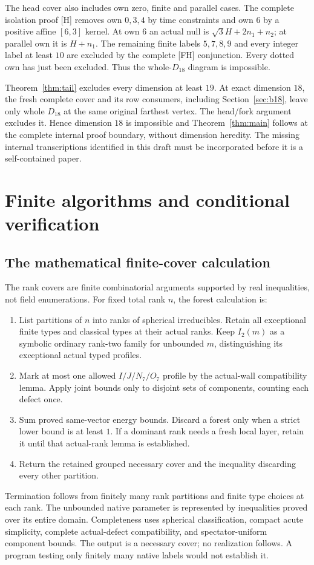 \documentclass[11pt]{article}
\theoremstyle{definition}
\theoremstyle{remark}
\newcommand{\src}[1]{\textnormal{\textsf{[#1]}}}
\begin{document}
The head cover also includes own zero, finite and parallel
cases. The complete isolation proof \src{H} removes own
\(0,3,4\) by time constraints and own \(6\) by a positive
affine \([6,3]\) kernel. At own \(6\) an actual null is
\(\sqrt3H+2n_1+n_2\); at parallel own it is \(H+n_1\).
The remaining finite labels \(5,7,8,9\) and every integer
label at least \(10\) are excluded by the complete \src{FH}
conjunction. Every dotted own has just been excluded.
Thus the whole-\(D_{18}\) diagram is impossible.

Theorem~\ref{thm:tail} excludes every dimension at least \(19\).
At exact dimension \(18\), the fresh complete cover and its
row consumers, including Section~\ref{sec:b18}, leave only
whole \(D_{18}\) at the same original farthest vertex.
The head/fork argument excludes it. Hence dimension \(18\)
is impossible and Theorem~\ref{thm:main} follows at the
complete internal proof boundary, without dimension heredity.
The missing internal transcriptions identified in this draft
must be incorporated before it is a self-contained paper.

\section{Finite algorithms and conditional verification}
\label{sec:verification}
\subsection{The mathematical finite-cover calculation}
The rank covers are finite combinatorial arguments supported
by real inequalities, not field enumerations.
For fixed total rank \(n\), the forest calculation is:
\begin{enumerate}
\item List partitions of \(n\) into ranks of spherical irreducibles.
 Retain all exceptional finite types and classical types at
 their actual ranks. Keep \(I_2(m)\) as a symbolic ordinary
 rank-two family for unbounded \(m\), distinguishing its
 exceptional actual typed profiles.
\item Mark at most one allowed \(I/J/N_7/O_7\) profile by the
 actual-wall compatibility lemma. Apply joint bounds only to
 disjoint sets of components, counting each defect once.
\item Sum proved same-vector energy bounds. Discard a forest only
 when a strict lower bound is at least \(1\). If a dominant
 rank needs a fresh local layer, retain it until that
 actual-rank lemma is established.
\item Return the retained grouped necessary cover and the
 inequality discarding every other partition.
\end{enumerate}
Termination follows from finitely many rank partitions and
finite type choices at each rank. The unbounded native
parameter is represented by inequalities proved over its
entire domain. Completeness uses spherical classification,
compact acute simplicity, complete actual-defect compatibility,
and spectator-uniform component bounds. The output is a
necessary cover; no realization follows. A program testing
only finitely many native labels would not establish it.
\end{document}
